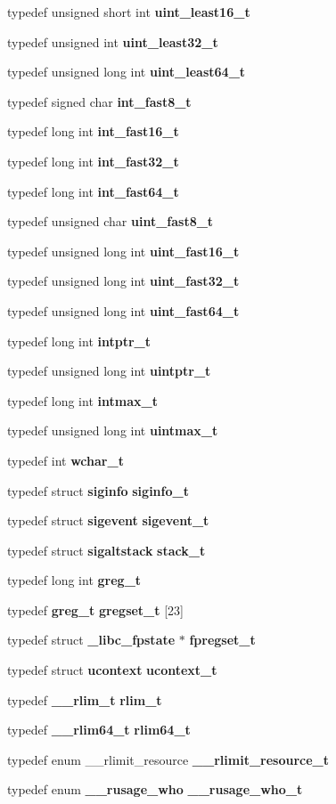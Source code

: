 \begin{DoxyCompactItemize}
\item 
typedef unsigned short int {\bf uint\_\-least16\_\-t}
\item 
typedef unsigned int {\bf uint\_\-least32\_\-t}
\item 
typedef unsigned long int {\bf uint\_\-least64\_\-t}
\item 
typedef signed char {\bf int\_\-fast8\_\-t}
\item 
typedef long int {\bf int\_\-fast16\_\-t}
\item 
typedef long int {\bf int\_\-fast32\_\-t}
\item 
typedef long int {\bf int\_\-fast64\_\-t}
\item 
typedef unsigned char {\bf uint\_\-fast8\_\-t}
\item 
typedef unsigned long int {\bf uint\_\-fast16\_\-t}
\item 
typedef unsigned long int {\bf uint\_\-fast32\_\-t}
\item 
typedef unsigned long int {\bf uint\_\-fast64\_\-t}
\item 
typedef long int {\bf intptr\_\-t}
\item 
typedef unsigned long int {\bf uintptr\_\-t}
\item 
typedef long int {\bf intmax\_\-t}
\item 
typedef unsigned long int {\bf uintmax\_\-t}
\item 
typedef int {\bf wchar\_\-t}
\item 
typedef struct {\bf siginfo} {\bf siginfo\_\-t}
\item 
typedef struct {\bf sigevent} {\bf sigevent\_\-t}
\item 
typedef struct {\bf sigaltstack} {\bf stack\_\-t}
\item 
typedef long int {\bf greg\_\-t}
\item 
typedef {\bf greg\_\-t} {\bf gregset\_\-t} [23]
\item 
typedef struct {\bf \_\-libc\_\-fpstate} $\ast$ {\bf fpregset\_\-t}
\item 
typedef struct {\bf ucontext} {\bf ucontext\_\-t}
\item 
typedef {\bf \_\-\_\-rlim\_\-t} {\bf rlim\_\-t}
\item 
typedef {\bf \_\-\_\-rlim64\_\-t} {\bf rlim64\_\-t}
\item 
typedef enum \_\-\_\-rlimit\_\-resource {\bf \_\-\_\-rlimit\_\-resource\_\-t}
\item 
typedef enum {\bf \_\-\_\-rusage\_\-who} {\bf \_\-\_\-rusage\_\-who\_\-t}
\item 

\end{DoxyCompactItemize}
